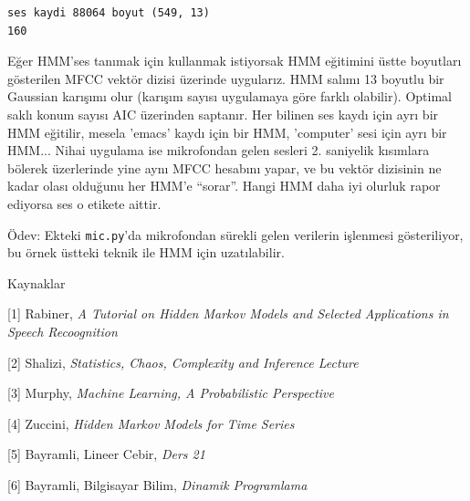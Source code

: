 \documentclass[12pt,fleqn]{article}\usepackage{../../common}
\begin{document}
\begin{verbatim}
ses kaydi 88064 boyut (549, 13)
160
\end{verbatim}

Eğer HMM'ses tanımak için kullanmak istiyorsak HMM eğitimini üstte
boyutları gösterilen MFCC vektör dizisi üzerinde uygularız. HMM salımı 13
boyutlu bir Gaussian karışımı olur (karışım sayısı uygulamaya göre farklı
olabilir). Optimal saklı konum sayısı AIC üzerinden saptanır. Her bilinen
ses kaydı için ayrı bir HMM eğitilir, mesela 'emacs' kaydı için bir HMM,
'computer' sesi için ayrı bir HMM... Nihai uygulama ise mikrofondan gelen
sesleri 2. saniyelik kısımlara bölerek üzerlerinde yine aynı MFCC hesabını
yapar, ve bu vektör dizisinin ne kadar olası olduğunu her HMM'e
``sorar''. Hangi HMM daha iyi olurluk rapor ediyorsa ses o etikete aittir.

Ödev: Ekteki \verb!mic.py!'da mikrofondan sürekli gelen verilerin işlenmesi
gösteriliyor, bu örnek üstteki teknik ile HMM için uzatılabilir.


Kaynaklar 

[1] Rabiner, {\em A Tutorial on Hidden Markov Models and Selected Applications in Speech
Recoognition}

[2] Shalizi, {\em Statistics, Chaos, Complexity and Inference Lecture}

[3] Murphy, {\em Machine Learning, A Probabilistic Perspective}

[4] Zuccini, {\em Hidden Markov Models for Time Series}

[5] Bayramli, Lineer Cebir, {\em Ders 21}

[6] Bayramli, Bilgisayar Bilim, {\em Dinamik Programlama}
\end{document}
